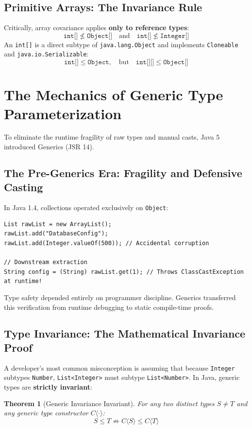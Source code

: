 \documentclass[10pt,journal,compsoc,onecolumn]{IEEEtran}
\newtheorem{theorem}{Theorem}
\begin{document}
\subsection{Primitive Arrays: The Invariance Rule}
Critically, array covariance applies \textbf{only to reference types}:
\begin{equation}
\texttt{int[]} \not\le \texttt{Object[]} \quad \text{and} \quad \texttt{int[]} \not\le \texttt{Integer[]}
\end{equation}
An \texttt{int[]} is a direct subtype of \texttt{java.lang.Object} and implements \texttt{Cloneable} and \texttt{java.io.Serializable}:
\begin{equation}
\texttt{int[]} \le \texttt{Object}, \quad \text{but} \quad \texttt{int[][]} \le \texttt{Object[]}
\end{equation}

\section{The Mechanics of Generic Type Parameterization}
\label{sec:generics_foundations}

To eliminate the runtime fragility of raw types and manual casts, Java 5 introduced Generics (JSR 14).

\subsection{The Pre-Generics Era: Fragility and Defensive Casting}
In Java 1.4, collections operated exclusively on \texttt{Object}:
\begin{lstlisting}[caption={Java 1.4 Raw Collection Vulnerability}]
List rawList = new ArrayList();
rawList.add("DatabaseConfig");
rawList.add(Integer.valueOf(500)); // Accidental corruption

// Downstream extraction
String config = (String) rawList.get(1); // Throws ClassCastException at runtime!
\end{lstlisting}
Type safety depended entirely on programmer discipline. Generics transferred this verification from runtime debugging to static compile-time proofs.

\subsection{Type Invariance: The Mathematical Invariance Proof}
A developer's most common misconception is assuming that because \texttt{Integer} subtypes \texttt{Number}, \texttt{List<Integer>} must subtype \texttt{List<Number>}. In Java, generic types are \textbf{strictly invariant}:
\begin{theorem}[Generic Invariance Invariant]
For any two distinct types $S \neq T$ and any generic type constructor $C\langle \cdot \rangle$:
\begin{equation}
S \le T \nRightarrow C\langle S \rangle \le C\langle T \rangle
\end{equation}
\end{theorem}
\end{document}
